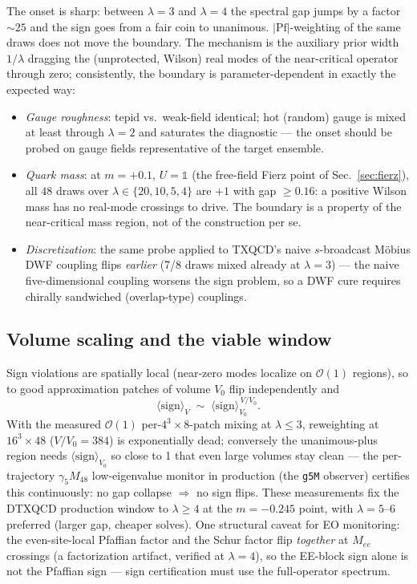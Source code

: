 \documentclass[11pt]{article}
\begin{document}
The onset is sharp: between $\lambda=3$ and $\lambda=4$ the spectral gap
jumps by a factor $\sim\!25$ and the sign goes from a fair coin to
unanimous.  $|\mathrm{Pf}|$-weighting of the same draws does not move the
boundary.  The mechanism is the auxiliary prior width $1/\lambda$ dragging
the (unprotected, Wilson) real modes of the near-critical operator through
zero; consistently, the boundary is parameter-dependent in exactly the
expected way:
\begin{itemize}
\item \emph{Gauge roughness}: tepid vs.\ weak-field identical; hot
(random) gauge is mixed at least through $\lambda=2$ and saturates the
diagnostic --- the onset should be probed on gauge fields representative
of the target ensemble.
\item \emph{Quark mass}: at $m=+0.1$, $U=\mathbb{1}$ (the free-field
Fierz point of Sec.~\ref{sec:fierz}), all $48$ draws over
$\lambda\in\{20,10,5,4\}$ are $+1$ with gap $\ge0.16$: a positive Wilson
mass has no real-mode crossings to drive.  The boundary is a property of
the near-critical mass region, not of the construction per se.
\item \emph{Discretization}: the same probe applied to TXQCD's naive
$s$-broadcast M\"obius DWF coupling flips \emph{earlier} (7/8 draws
mixed already at $\lambda=3$) --- the naive five-dimensional coupling
worsens the sign problem, so a DWF cure requires chirally sandwiched
(overlap-type) couplings.
\end{itemize}

\subsection{Volume scaling and the viable window}

Sign violations are spatially local (near-zero modes localize on
$\mathcal{O}(1)$ regions), so to good approximation patches of volume
$V_{0}$ flip independently and
\begin{equation}
\langle\mathrm{sign}\rangle_{V}\;\sim\;
\langle\mathrm{sign}\rangle_{V_{0}}^{\,V/V_{0}} .
\end{equation}
With the measured $\mathcal{O}(1)$ per-$4^{3}\times8$-patch mixing at
$\lambda\le3$, reweighting at $16^{3}\times48$ ($V/V_{0}=384$) is
exponentially dead; conversely the unanimous-plus region needs
$\langle\mathrm{sign}\rangle_{V_{0}}$ so close to 1 that even large
volumes stay clean --- the per-trajectory
$\gamma_{5}M_{48}$ low-eigenvalue monitor in production (the
\texttt{g5M} observer) certifies this continuously: no gap
collapse $\Rightarrow$ no sign flips.  These measurements fix the DTXQCD
production window to $\lambda\ge4$ at the $m=-0.245$ point, with
$\lambda=5$--$6$ preferred (larger gap, cheaper solves).  One structural
caveat for EO monitoring: the even-site-local Pfaffian factor and the Schur
factor flip \emph{together} at $M_{ee}$ crossings (a factorization
artifact, verified at $\lambda=4$), so the EE-block sign alone is not the
Pfaffian sign --- sign certification must use the full-operator spectrum.
\end{document}
